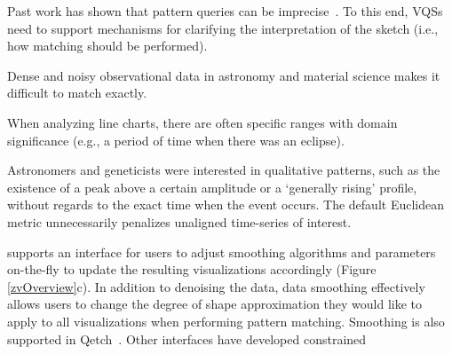  Past work has shown that pattern queries can be imprecise~\cite{correll2016semantics,Holz2009,Eichmann2015}. To this end, VQSs need to support mechanisms for clarifying the interpretation of the sketch (i.e., how matching should be performed).
\problemlist
  \item Dense and noisy observational data in astronomy and material science makes it difficult to match exactly.
  \item When analyzing line charts, there are often specific ranges with domain significance (e.g., a period of time when there was an eclipse).
  \item Astronomers and geneticists were interested in qualitative patterns, such as the existence of a peak above a certain amplitude or a `generally rising' profile, without regards to the exact time when the event occurs. The default Euclidean metric unnecessarily penalizes unaligned time-series of interest.
\enumend
\featurelist
\item \zvpp supports an interface for users to adjust smoothing algorithms and parameters on-the-fly to update the resulting visualizations accordingly (Figure \ref{zvOverview}c). In addition to denoising the data, data smoothing effectively allows users to change the degree of shape approximation they would like to apply to all visualizations when performing pattern matching. Smoothing is also supported in Qetch~\cite{Mannino2018}. Other interfaces have developed constrained
